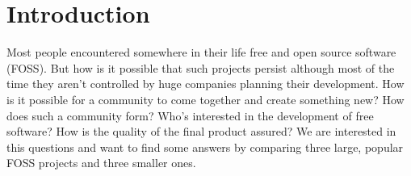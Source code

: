 \section{Introduction}


Most people encountered somewhere in their life free and open source software (FOSS). But how is it possible that such projects persist although most of the time they aren't controlled by huge companies planning their development. How is it possible for a community to come together and create something new? How does such a community form? Who's interested in the development of free software? How is the quality of the final product assured? We are interested in this questions and want to find some answers by comparing three large, popular FOSS projects and three smaller ones.


